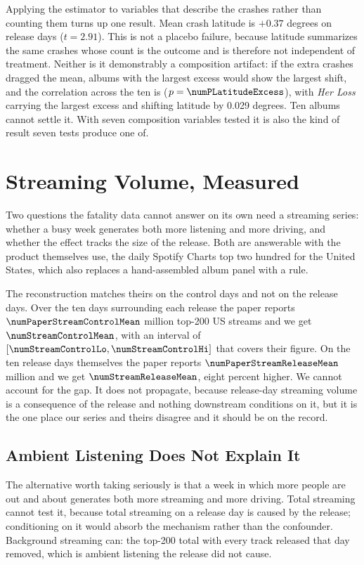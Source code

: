 \documentclass[11pt]{article}
\begin{document}
Applying the estimator to variables that describe the crashes rather than counting them turns up
one result. Mean crash latitude is $+0.37$ degrees on release days ($t = 2.91$). This is not a
placebo failure, because latitude summarizes the same crashes whose count is the outcome and is
therefore not independent of treatment. Neither is it demonstrably a composition artifact: if the
extra crashes dragged the mean, albums with the largest excess would show the largest shift, and
the correlation across the ten is \numRLatitudeExcess{} ($p = \numPLatitudeExcess$), with
\emph{Her Loss} carrying the largest excess and shifting latitude by 0.029 degrees. Ten albums
cannot settle it. With seven composition variables tested it is also the kind of result seven tests
produce one of.

\section{Streaming Volume, Measured}
\label{sec:streaming}

Two questions the fatality data cannot answer on its own need a streaming series: whether
a busy week generates both more listening and more driving, and whether the effect tracks
the size of the release. Both are answerable with the product
\citet{patel2026smartphones} themselves use, the daily Spotify Charts top two hundred for
the United States, which also replaces a hand-assembled album panel with a rule.

The reconstruction matches theirs on the control days and not on the release days. Over
the ten days surrounding each release the paper reports $\numPaperStreamControlMean$
million top-200 US streams and we get $\numStreamControlMean$, with an interval of
$[\numStreamControlLo, \numStreamControlHi]$ that covers their figure. On the ten release
days themselves the paper reports $\numPaperStreamReleaseMean$ million and we get
$\numStreamReleaseMean$, eight percent higher. We cannot account for the gap. It does not
propagate, because release-day streaming volume is a consequence of the release and
nothing downstream conditions on it, but it is the one place our series and theirs
disagree and it should be on the record.

\subsection{Ambient Listening Does Not Explain It}

The alternative worth taking seriously is that a week in which more people are out and
about generates both more streaming and more driving. Total streaming cannot test it,
because total streaming on a release day is caused by the release; conditioning on it
would absorb the mechanism rather than the confounder. Background streaming can: the
top-200 total with every track released that day removed, which is ambient listening the
release did not cause.
\end{document}
